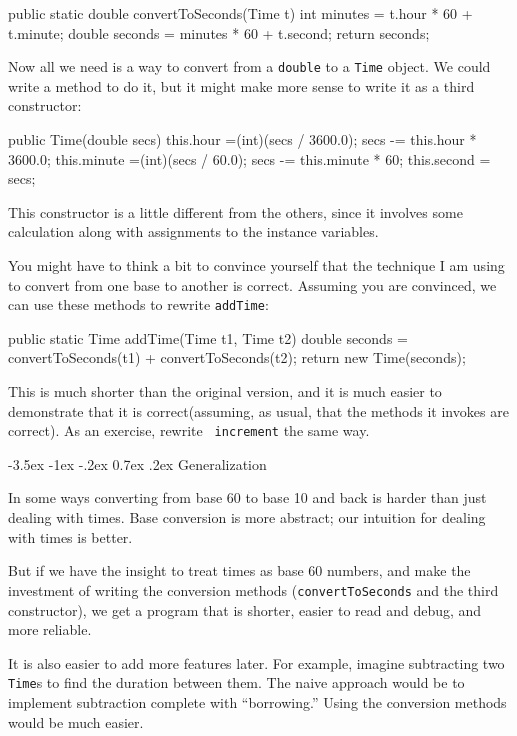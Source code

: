 \documentclass{book}
\makeatletter
\renewcommand{\section}{\@startsection 
    {section} {1} {0mm}%
    {-3.5ex \@plus -1ex \@minus -.2ex}%
    {0.7ex \@plus.2ex}%
    {\normalfont\Large\bfseries}}
\makeatother
\begin{document}
\begin{verbatimtab}
  public static double convertToSeconds(Time t) {
    int minutes = t.hour * 60 + t.minute;
    double seconds = minutes * 60 + t.second;
    return seconds;
  }
\end{verbatimtab}
%
Now all we need is a way to convert from a {\tt double}
to a {\tt Time} object.  We could write a method to
do it, but it might make more sense to write it as a third
constructor:

\begin{verbatimtab}
  public Time(double secs) {
    this.hour =(int)(secs / 3600.0);
    secs -= this.hour * 3600.0;
    this.minute =(int)(secs / 60.0);
    secs -= this.minute * 60;
    this.second = secs;
  }
\end{verbatimtab}
%
This constructor is a little different from the others, since
it involves some calculation along with assignments to the
instance variables.

You might have to think a bit to convince yourself that the technique
I am using to convert from one base to another is correct.  Assuming
you are convinced, we can use these methods to rewrite {\tt addTime}:

\begin{verbatimtab}
  public static Time addTime(Time t1, Time t2) {
    double seconds = convertToSeconds(t1) + convertToSeconds(t2);
    return new Time(seconds);
  }
\end{verbatimtab}
%
This is much shorter than the original version, and it is much easier
to demonstrate that it is correct(assuming, as usual, that the
methods it invokes are correct).  As an exercise, rewrite {\tt
increment} the same way.


\section{Generalization}

In some ways converting from base 60 to base 10 and back is
harder than just dealing with times.  Base conversion is more
abstract; our intuition for dealing with times is better.

But if we have the insight to treat times as base 60 numbers,
and make the investment of writing the conversion methods
({\tt convertToSeconds} and the third constructor), we get
a program that is shorter, easier to read and debug, and more
reliable.

It is also easier to add more features later.  For example, imagine
subtracting two {\tt Time}s to find the duration between them.  The
naive approach would be to implement subtraction complete with
``borrowing.''  Using the conversion methods would be much easier.
\end{document}
